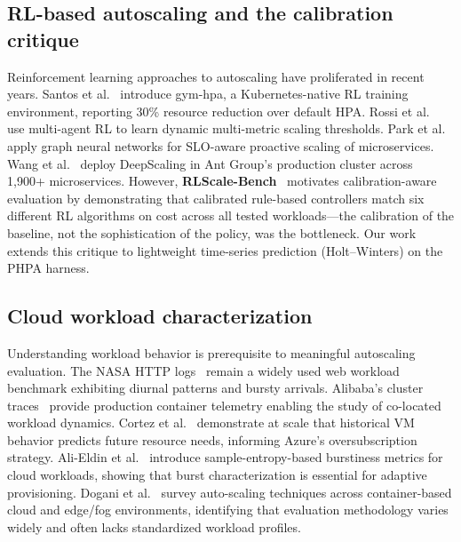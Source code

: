 \documentclass[journal]{IEEEtran}
\begin{document}
\subsection{RL-based autoscaling and the calibration critique}
Reinforcement learning approaches to autoscaling have proliferated in recent years. Santos et al.~\cite{santos2023} introduce gym-hpa, a Kubernetes-native RL training environment, reporting 30\% resource reduction over default HPA. Rossi et al.~\cite{rossi2023} use multi-agent RL to learn dynamic multi-metric scaling thresholds. Park et al.~\cite{park2024} apply graph neural networks for SLO-aware proactive scaling of microservices. Wang et al.~\cite{wang2024} deploy DeepScaling in Ant Group's production cluster across 1,900+ microservices. However, \textbf{RLScale-Bench}~\cite{rlscale2026} motivates calibration-aware evaluation by demonstrating that calibrated rule-based controllers match six different RL algorithms on cost across all tested workloads---the calibration of the baseline, not the sophistication of the policy, was the bottleneck. Our work extends this critique to lightweight time-series prediction (Holt--Winters) on the PHPA harness.

\subsection{Cloud workload characterization}
Understanding workload behavior is prerequisite to meaningful autoscaling evaluation. The NASA HTTP logs~\cite{arlitt1996} remain a widely used web workload benchmark exhibiting diurnal patterns and bursty arrivals. Alibaba's cluster traces~\cite{jiang2020} provide production container telemetry enabling the study of co-located workload dynamics. Cortez et al.~\cite{cortez2017} demonstrate at scale that historical VM behavior predicts future resource needs, informing Azure's oversubscription strategy. Ali-Eldin et al.~\cite{alieldin2014} introduce sample-entropy-based burstiness metrics for cloud workloads, showing that burst characterization is essential for adaptive provisioning. Dogani et al.~\cite{dogani2023} survey auto-scaling techniques across container-based cloud and edge/fog environments, identifying that evaluation methodology varies widely and often lacks standardized workload profiles.
\end{document}
